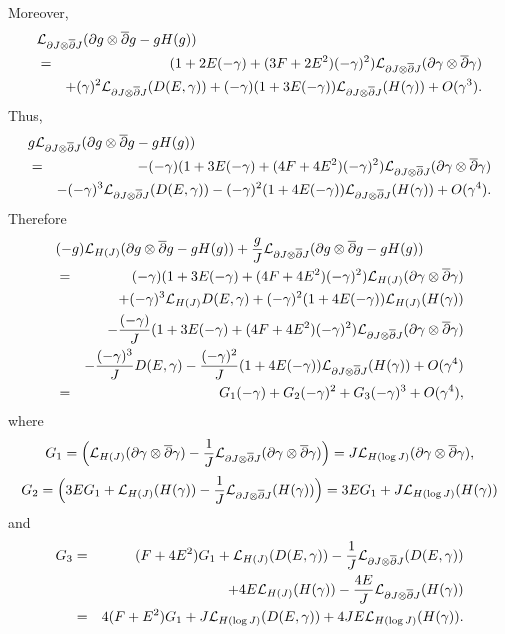 \documentclass[12pt]{amsart}
\def\d{\partial}
\def\dbar{\overline{\partial}}
\def\d{\partial}
\def\cal{\mathcal}
\begin{document}
Moreover,
\begin{eqnarray*}
\lefteqn{{\cal L}_{\d J\otimes \dbar J} (\d g\otimes \dbar g- gH(g))}\\
&=&(1+2E(-\gamma)+(3F+2E^2)(-\gamma)^2  ) {\cal L}_{\d J\otimes \dbar J} (\d \gamma \otimes \dbar \gamma) \\
&&+(\gamma)^2  {\cal L}_{\d J\otimes \dbar J}(D(E,\gamma))+(-\gamma)(1+3E(-\gamma)) {\cal  L}_{\d J\otimes \dbar J} (H(\gamma))+ O(\gamma^3).
\end{eqnarray*}
Thus,
\begin{eqnarray*}
\lefteqn{ g {\cal L}_{\d J\otimes \dbar J} (\d g\otimes \dbar g- gH(g))}\\
&=&-(-\gamma) (1+3E(-\gamma)+(4F+4E^2)(-\gamma)^2  ) {\cal L}_{\d J\otimes \dbar J} (\d \gamma \otimes \dbar \gamma) \\
&&-(-\gamma)^3  {\cal L}_{\d J\otimes \dbar J}(D(E,\gamma))- (-\gamma)^2(1+4E(-\gamma)) {\cal  L}_{\d J\otimes \dbar J} (H(\gamma))+ O(\gamma^4).
\end{eqnarray*}
Therefore
\begin{eqnarray*}
\lefteqn{(-g) {\cal L}_{H(J)} (\d g\otimes \dbar g- gH(g))+  {g \over J} {\cal L}_{\d J\otimes \dbar J} (\d g\otimes \dbar g- gH(g)) }\\
&=&(-\gamma) (1+3E(-\gamma)+(4F+4E^2)(-\gamma)^2  ) {\cal L}_{H(J)} (\d \gamma \otimes \dbar \gamma) \\
&&+(-\gamma)^3 {\cal L}_{H(J)} D(E,\gamma)+(-\gamma)^2(1+4E(-\gamma)) {\cal  L}_{H(J)} (H(\gamma))\\
&&-{(-\gamma) \over J}(1+3E(-\gamma)+(4F+4E^2)(-\gamma)^2  ) {\cal L}_{\d J\otimes \dbar J} (\d \gamma \otimes \dbar \gamma) \\
&&-{(-\gamma)^3\over J}   D(E,\gamma)- {(-\gamma)^2\over J} (1+4E(-\gamma)) {\cal  L}_{\d J\otimes \dbar J} (H(\gamma))+ O(\gamma^4) \\
&=&G_1(-\gamma)+G_2(-\gamma)^2+G_3(-\gamma)^3+O(\gamma^4),
\end{eqnarray*}
where
$$
G_1= \Big({\cal L}_{H(J)}(\d \gamma \otimes \dbar \gamma)-{1\over J} {\cal  L}_{\d J\otimes \dbar J}(\d \gamma\otimes \dbar \gamma)\Big)
=J{\cal L}_{H(\log J)}(\d \gamma \otimes \dbar \gamma),
$$
$$
G_2=\Big(3E  G_1 +{\cal L}_{H(J)}(H(\gamma))-{1\over J}{\cal L}_{\d J\otimes \dbar J} (H(\gamma))\Big)
=3EG_1+J {\cal L}_{H(\log J)}(H(\gamma))
$$
and
\begin{eqnarray*}
G_3&=& (F+4E^2)G_1+{\cal L}_{H(J)} (D(E, \gamma) )-{1\over J} {\cal L}_{\d J\otimes \dbar J} (D(E,\gamma))\\
&&+4E {\cal L}_{H(J)}(H(\gamma))
-{4E \over J} {\cal L}_{\d J\otimes \dbar J}(H(\gamma))\\
&=&4(F+E^2) G_1+J {\cal L}_{H(\log J)}(D(E, \gamma))+4JE {\cal L}_{H(\log J)}(H(\gamma)).
\end{eqnarray*}
\end{document}
